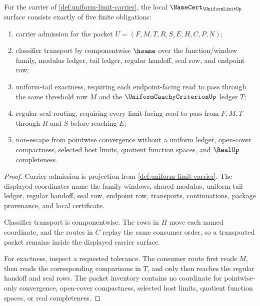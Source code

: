\begin{theorem}
\label{thm:uniform-limit-namecert-obligations}
For the carrier of \autoref{def:uniform-limit-carrier}, the local $\NameCert_{\UniformLimitUp}$ surface consists exactly of five finite obligations:
\begin{enumerate}
\item carrier admission for the packet $U=(F,M,T,R,S,E,H,C,P,N)$;
\item classifier transport by componentwise $\hsame$ over the function/window family, modulus ledger, tail ledger, regular handoff, seal row, and endpoint row;
\item uniform-tail exactness, requiring each endpoint-facing read to pass through the same threshold row $M$ and the $\UniformCauchyCriterionUp$ ledger $T$;
\item regular-seal routing, requiring every limit-facing read to pass from $F,M,T$ through $R$ and $S$ before reaching $E$;
\item non-escape from pointwise convergence without a uniform ledger, open-cover compactness, selected host limits, quotient function spaces, and $\RealUp$ completeness.
\end{enumerate}
\end{theorem}
\begin{proof}
Carrier admission is projection from \autoref{def:uniform-limit-carrier}. The displayed coordinates name the family windows, shared modulus, uniform tail ledger, regular handoff, seal row, endpoint row, transports, continuations, package provenance, and local certificate.

Classifier transport is componentwise. The rows in $H$ move each named coordinate, and the routes in $C$ replay the same consumer order, so a transported packet remains inside the displayed carrier surface.

For exactness, inspect a requested tolerance. The consumer route first reads $M$, then reads the corresponding comparisons in $T$, and only then reaches the regular handoff and seal rows. The packet inventory contains no coordinate for pointwise-only convergence, open-cover compactness, selected host limits, quotient function spaces, or real completeness.
\end{proof}

